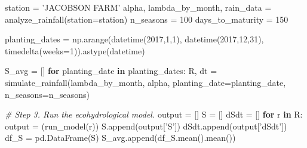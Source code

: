 \documentclass[11pt]{article}
\newenvironment{Shaded}{}{}
\newcommand{\KeywordTok}[1]{\textcolor[rgb]{0.00,0.44,0.13}{\textbf{{#1}}}}
\newcommand{\DecValTok}[1]{\textcolor[rgb]{0.25,0.63,0.44}{{#1}}}
\newcommand{\StringTok}[1]{\textcolor[rgb]{0.25,0.44,0.63}{{#1}}}
\newcommand{\CommentTok}[1]{\textcolor[rgb]{0.38,0.63,0.69}{\textit{{#1}}}}
\newcommand{\NormalTok}[1]{{#1}}
\newcommand{\ControlFlowTok}[1]{\textcolor[rgb]{0.00,0.44,0.13}{\textbf{{#1}}}}
\newcommand{\OperatorTok}[1]{\textcolor[rgb]{0.40,0.40,0.40}{{#1}}}
\begin{document}
\begin{Shaded}
\begin{Highlighting}[]
\NormalTok{station }\OperatorTok{=} \StringTok{'JACOBSON FARM'}
\NormalTok{alpha, lambda_by_month, rain_data }\OperatorTok{=}\NormalTok{ analyze_rainfall(station}\OperatorTok{=}\NormalTok{station)}
\NormalTok{n_seasons }\OperatorTok{=} \DecValTok{100}
\NormalTok{days_to_maturity }\OperatorTok{=} \DecValTok{150}

\NormalTok{planting_dates }\OperatorTok{=}\NormalTok{ np.arange(datetime(}\DecValTok{2017}\NormalTok{,}\DecValTok{1}\NormalTok{,}\DecValTok{1}\NormalTok{), datetime(}\DecValTok{2017}\NormalTok{,}\DecValTok{12}\NormalTok{,}\DecValTok{31}\NormalTok{), timedelta(weeks}\OperatorTok{=}\DecValTok{1}\NormalTok{)).astype(datetime)}

\NormalTok{S_avg }\OperatorTok{=}\NormalTok{ []}
\ControlFlowTok{for}\NormalTok{ planting_date }\KeywordTok{in}\NormalTok{ planting_dates:}
\NormalTok{    R, dt }\OperatorTok{=}\NormalTok{ simulate_rainfall(lambda_by_month, alpha, planting_date}\OperatorTok{=}\NormalTok{planting_date, n_seasons}\OperatorTok{=}\NormalTok{n_seasons)}

    \CommentTok{# Step 3. Run the ecohydrological model.}
\NormalTok{    output }\OperatorTok{=}\NormalTok{ []}
\NormalTok{    S }\OperatorTok{=}\NormalTok{ []}
\NormalTok{    dSdt }\OperatorTok{=}\NormalTok{ []}
    \ControlFlowTok{for}\NormalTok{ r }\KeywordTok{in}\NormalTok{ R:}
\NormalTok{        output }\OperatorTok{=}\NormalTok{ (run_model(r))}
\NormalTok{        S.append(output[}\StringTok{'S'}\NormalTok{])}
\NormalTok{        dSdt.append(output[}\StringTok{'dSdt'}\NormalTok{])}
\NormalTok{    df_S }\OperatorTok{=}\NormalTok{ pd.DataFrame(S)}
\NormalTok{    S_avg.append(df_S.mean().mean())}
\end{Highlighting}
\end{Shaded}
\end{document}
